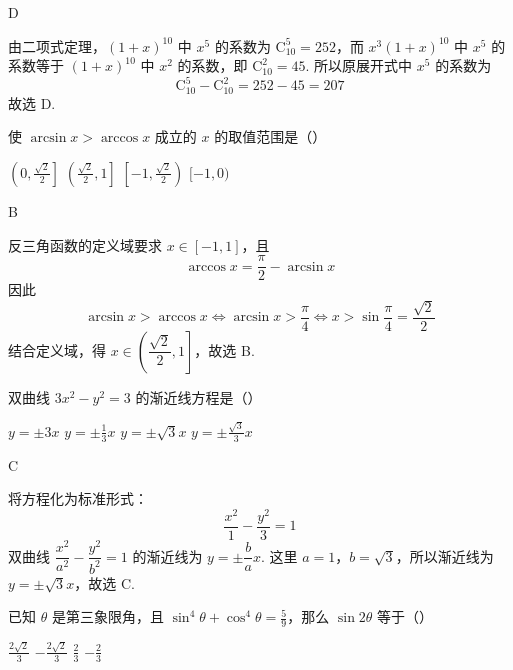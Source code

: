 \documentclass[UTF8,a4paper,oneside,11pt]{ctexbook}
\begin{document}
\begin{answer}
D
\end{answer}

\begin{solution}
由二项式定理，\((1+x)^{10}\) 中 \(x^5\) 的系数为 \(\mathrm C_{10}^{5}=252\)，而 \(x^3(1+x)^{10}\) 中 \(x^5\) 的系数等于 \((1+x)^{10}\) 中 \(x^2\) 的系数，即 \(\mathrm C_{10}^{2}=45\). 所以原展开式中 \(x^5\) 的系数为
\[
\mathrm C_{10}^{5}-\mathrm C_{10}^{2}=252-45=207
\]
故选 D.
\end{solution}

\begin{problem}
使 \(\arcsin x > \arccos x\) 成立的 \(x\) 的取值范围是（\quad）

\choices
    {\(\left(0, \frac{\sqrt{2}}{2}\right]\)}
    {\(\left(\frac{\sqrt{2}}{2}, 1\right]\)}
    {\(\left[-1, \frac{\sqrt{2}}{2}\right)\)}
    {\([-1, 0)\)}
\end{problem}

\begin{answer}
B
\end{answer}

\begin{solution}
反三角函数的定义域要求 \(x\in[-1,1]\)，且
\[
\arccos x=\frac{\pi}{2}-\arcsin x
\]
因此
\[
\arcsin x>\arccos x\Longleftrightarrow \arcsin x>\frac{\pi}{4}
\Longleftrightarrow x>\sin\frac{\pi}{4}=\frac{\sqrt2}{2}
\]
结合定义域，得 \(x\in\left(\dfrac{\sqrt2}{2},1\right]\)，故选 B.
\end{solution}

\begin{problem}
双曲线 \(3x^{2} - y^{2} = 3\) 的渐近线方程是（\quad）

\choices
    {\(y = \pm 3x \)}
    {\(y = \pm \frac{1}{3} x \)}
    {\(y = \pm \sqrt{3} x \)}
    {\(y = \pm \frac{\sqrt{3}}{3} x \)}
\end{problem}

\begin{answer}
C
\end{answer}

\begin{solution}
将方程化为标准形式：
\[
\frac{x^2}{1}-\frac{y^2}{3}=1
\]
双曲线 \(\dfrac{x^2}{a^2}-\dfrac{y^2}{b^2}=1\) 的渐近线为 \(y=\pm\dfrac ba x\). 这里 \(a=1\)，\(b=\sqrt3\)，所以渐近线为 \(y=\pm\sqrt3 x\)，故选 C.
\end{solution}

\begin{problem}
已知 \(\theta\) 是第三象限角，且 \(\sin^4\theta + \cos^4\theta = \frac{5}{9}\)，那么 \(\sin 2\theta\) 等于（\quad）

\choices
    {\(\frac{2\sqrt{2}}{3}\)}
    {\(-\frac{2\sqrt{2}}{3}\)}
    {\(\frac{2}{3}\)}
    {\(-\frac{2}{3}\)}
\end{problem}
\end{document}
